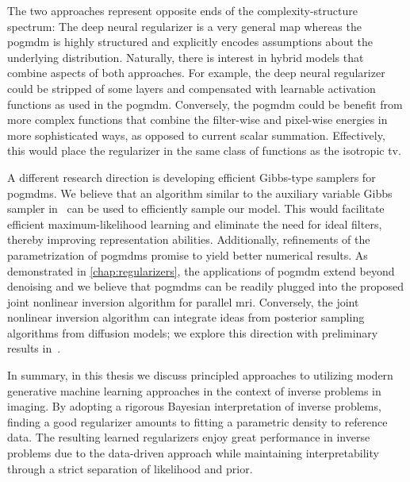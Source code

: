 The two approaches represent opposite ends of the complexity-structure spectrum:
The deep neural regularizer is a very general map whereas the \gls{pogmdm} is highly structured and explicitly encodes assumptions about the underlying distribution.
Naturally, there is interest in hybrid models that combine aspects of both approaches.
For example, the deep neural regularizer could be stripped of some layers and compensated with learnable activation functions as used in the \gls{pogmdm}.
Conversely, the \gls{pogmdm} could be benefit from more complex functions that combine the filter-wise and pixel-wise energies in more sophisticated ways, as opposed to current scalar summation.
Effectively, this would place the regularizer in the same class of functions as the isotropic \gls{tv}.

A different research direction is developing efficient Gibbs-type samplers for \glspl{pogmdm}.
We believe that an algorithm similar to the auxiliary variable Gibbs sampler in~\cite{schmidt_generative_2010} can be used to efficiently sample our model.
This would facilitate efficient maximum-likelihood learning and eliminate the need for ideal filters, thereby improving representation abilities.
Additionally, refinements of the parametrization of \glspl{pogmdm} promise to yield better numerical results.
As demonstrated in \cref{chap:regularizers}, the applications of \gls{pogmdm} extend beyond denoising and we believe that \glspl{pogmdm} can be readily plugged into the proposed joint nonlinear inversion algorithm for parallel \gls{mri}.
Conversely, the joint nonlinear inversion algorithm can integrate ideas from posterior sampling algorithms from diffusion models;
we explore this direction with preliminary results in~\cite{erlacher23}.

In summary, in this thesis we discuss principled approaches to utilizing modern generative machine learning approaches in the context of inverse problems in imaging.
By adopting a rigorous Bayesian interpretation of inverse problems, finding a good regularizer amounts to fitting a parametric density to reference data.
The resulting learned regularizers enjoy great performance in inverse problems due to the data-driven approach while maintaining interpretability through a strict separation of likelihood and prior.
